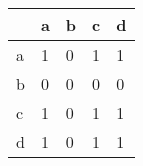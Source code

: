 \begin{tabular}{lllll}
\toprule
{} &  a &  b &  c &  d \\
\midrule
a &  1 &  0 &  1 &  1 \\
b &  0 &  0 &  0 &  0 \\
c &  1 &  0 &  1 &  1 \\
d &  1 &  0 &  1 &  1 \\
\bottomrule
\end{tabular}
